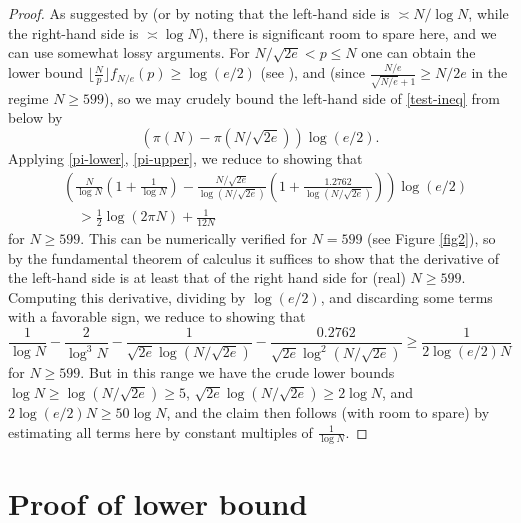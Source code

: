 \documentclass[12pt,a4paper,reqno]{amsart}
\numberwithin{equation}{section}
\theoremstyle{plain}
\theoremstyle{definition}
\begin{document}
\begin{proof}
As suggested by  (or by noting that the left-hand side is $\asymp N/\log N$, while the right-hand side is $\asymp \log N$), there is significant room to spare here, and we can use somewhat lossy arguments.
For $N/\sqrt{2e} < p \leq N$ one can obtain the lower bound $\lfloor \frac{N}{p} \rfloor f_{N/e}(p) \geq \log (e/2)$ (see ), and (since $\frac{N/e}{\sqrt{N/e}+1} \geq N/2e$ in the regime $N \geq 599$), so we may crudely bound the left-hand side of \eqref{test-ineq} from below by
$$ \left(\pi(N) - \pi(N/\sqrt{2e})\right) \log(e/2).$$
Applying \eqref{pi-lower}, \eqref{pi-upper}, we reduce to showing that
\begin{equation}\label{test-2}
\begin{split}
  &  \left(\frac{N}{\log N} \left(1 +\frac{1}{\log N}\right)
- \frac{N/\sqrt{2e}}{\log(N/\sqrt{2e})} \left(1 +\frac{1.2762}{\log(N/\sqrt{2e})}\right)\right) \log (e/2) \\
&\quad > \frac{1}{2} \log(2\pi N) + \frac{1}{12N}
\end{split}
\end{equation}
for $N \geq 599$. This can be numerically verified for $N=599$ (see Figure \ref{fig2}), so by the fundamental theorem of calculus it suffices to show that the derivative of the left-hand side is at least that of the right hand side for (real) $N \geq 599$.  Computing this derivative, dividing by $\log(e/2)$, and discarding some terms with a favorable sign, we reduce to showing that
$$ \frac{1}{\log N} - \frac{2}{\log^3 N} - \frac{1}{\sqrt{2e} \log(N/\sqrt{2e})} - \frac{0.2762}{\sqrt{2e} \log^2(N/\sqrt{2e})}  \geq \frac{1}{2\log(e/2) N}$$
for $N \geq 599$.  But in this range we have the crude lower bounds $\log N \geq \log(N/\sqrt{2e})\geq 5$, $\sqrt{2e} \log(N/\sqrt{2e}) \geq 2 \log N$, and $2 \log(e/2) N \geq 50 \log N$, and the claim then follows (with room to spare) by estimating all terms here by constant multiples of $\frac{1}{\log N}$.
\end{proof}

\section{Proof of lower bound}
\end{document}
